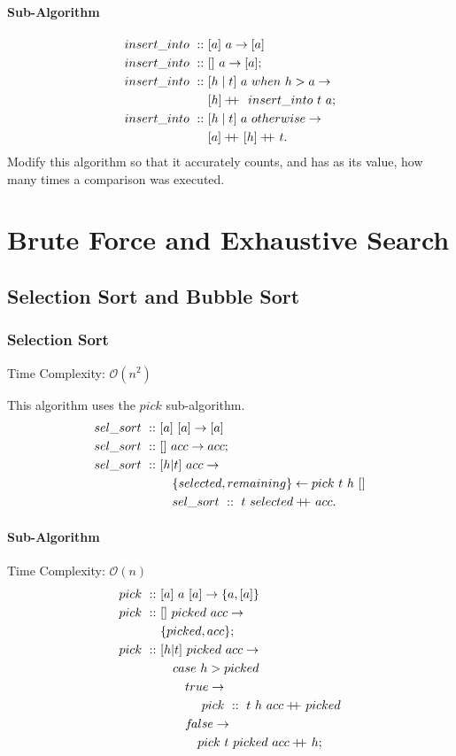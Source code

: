 \documentclass[a4paper,10pt]{book}
\newcommand\doubleplus{+\kern-1.3ex+\kern0.8ex}
\newcommand{\false}{f\kern-0.25ex{alse}}
\begin{document}
\subsubsection{Sub-Algorithm}
\begin{align*}
insert\_into\ ::\ &[a]\ a\rightarrow [a]\\
insert\_into\ ::\ &[]\ a\rightarrow [a];\\
insert\_into\ ::\ &[h\mid t]\ a\ when\ h>a\rightarrow\\
	&[h]\doubleplus\ insert\_into\ t\ a;\\
insert\_into\ ::\ &[h\mid t]\ a\ otherwise\rightarrow\\
	&[a]\doubleplus[h]\doubleplus t.
\end{align*}
Modify this algorithm so that it accurately counts, and has as its value, how many times a comparison was executed.
 
\chapter{Brute Force and Exhaustive Search}
\section{Selection Sort and Bubble Sort}
\subsection{Selection Sort}
Time Complexity: $\mathcal{O}(n^2)$

This algorithm uses the $pick$ sub-algorithm.
\begin{align*}
sel\_sort\ ::\ &[a]\ [a]\rightarrow[a]\\
sel\_sort\ ::\ &[]\ acc\rightarrow acc;\\
sel\_sort\ ::\ &[h|t]\ acc\rightarrow\\
       &\quad \{selected,remaining\}\leftarrow pick\ t\ h\ []\\
&\quad sel\_sort\ ::\ t\ selected\doubleplus acc.
\end{align*}
\subsubsection{Sub-Algorithm}Time Complexity: $\mathcal{O}(n)$
\begin{align*}
pick\ ::\ &[a]\ a\ [a]\rightarrow\{a,[a]\}\\
pick\ ::\ &[]\ picked\ acc\rightarrow\\
 &\{picked,acc\};\\
pick\ ::\ &[h|t]\ picked\ acc\rightarrow\\
       &\quad case\ h>picked\\
&\quad\quad  true\rightarrow\\
&\quad\quad\quad\ pick\ ::\ t\ h\ acc\doubleplus picked\\
&\quad\quad\false\rightarrow\\
&\quad\quad\quad pick\ t\ picked\ acc\doubleplus h;
\end{align*}
\end{document}
